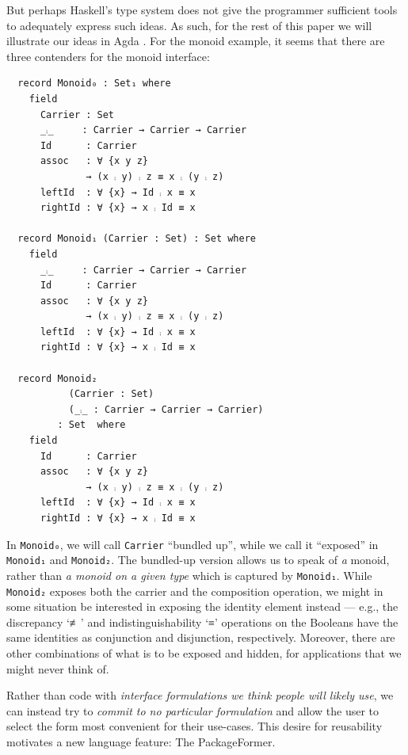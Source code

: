 \documentclass[sigplan,screen]{acmart}
\begin{document}
But perhaps Haskell's type system does not give the programmer sufficient
tools to adequately express such ideas. As such, for the rest of this paper
we will illustrate our ideas in Agda \cite{Norell-2007,agda_overview}.
For the monoid example,
it seems that there are three contenders for the monoid interface:

\noindent
\begin{verbatim}
  record Monoid₀ : Set₁ where
    field
      Carrier : Set
      _⨾_     : Carrier → Carrier → Carrier
      Id      : Carrier
      assoc   : ∀ {x y z}
              → (x ⨾ y) ⨾ z ≡ x ⨾ (y ⨾ z)
      leftId  : ∀ {x} → Id ⨾ x ≡ x
      rightId : ∀ {x} → x ⨾ Id ≡ x

  record Monoid₁ (Carrier : Set) : Set where
    field
      _⨾_     : Carrier → Carrier → Carrier
      Id      : Carrier
      assoc   : ∀ {x y z}
              → (x ⨾ y) ⨾ z ≡ x ⨾ (y ⨾ z)
      leftId  : ∀ {x} → Id ⨾ x ≡ x
      rightId : ∀ {x} → x ⨾ Id ≡ x

  record Monoid₂
           (Carrier : Set)
           (_⨾_ : Carrier → Carrier → Carrier)
         : Set  where
    field
      Id      : Carrier
      assoc   : ∀ {x y z}
              → (x ⨾ y) ⨾ z ≡ x ⨾ (y ⨾ z)
      leftId  : ∀ {x} → Id ⨾ x ≡ x
      rightId : ∀ {x} → x ⨾ Id ≡ x
\end{verbatim}

\vspace{0.3em}\noindent
In \texttt{Monoid₀}, we will call \texttt{Carrier} “bundled up”,
while we call it “exposed” in \texttt{Monoid₁} and \texttt{Monoid₂}.
The bundled-up version allows us to speak of \emph{a}
monoid, rather than \emph{a monoid on a given type} which is captured by \texttt{Monoid₁}.
While \texttt{Monoid₂} exposes both the carrier and the composition operation,
we might in some situation be interested
in exposing the identity element instead
--- e.g., the discrepancy ‘≢’ and indistinguishability ‘≡’ operations
on the Booleans
have the same identities as conjunction and disjunction, respectively.
Moreover, there are other combinations of what is to be exposed and hidden,
for applications that we might never think of.

Rather than code with \emph{interface formulations we think people will likely use}, we can
instead try to \emph{commit to no particular formulation} and allow the user to select
the form most convenient for their use-cases. This desire for reusability motivates
a new language feature: The \textsf{\upshape PackageFormer}.
\end{document}
